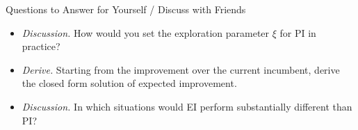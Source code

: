 \begin{frame}[c]{Questions to Answer for Yourself / Discuss with Friends}

\begin{itemize}
    \item \emph{Discussion.} How would you set the exploration parameter $\xi$ for PI in practice?
    \item \emph{Derive.} Starting from the improvement over the current incumbent, derive the closed form solution of expected improvement.
    \item \emph{Discussion.} In which situations would EI perform substantially different than PI?
\end{itemize}

\end{frame}